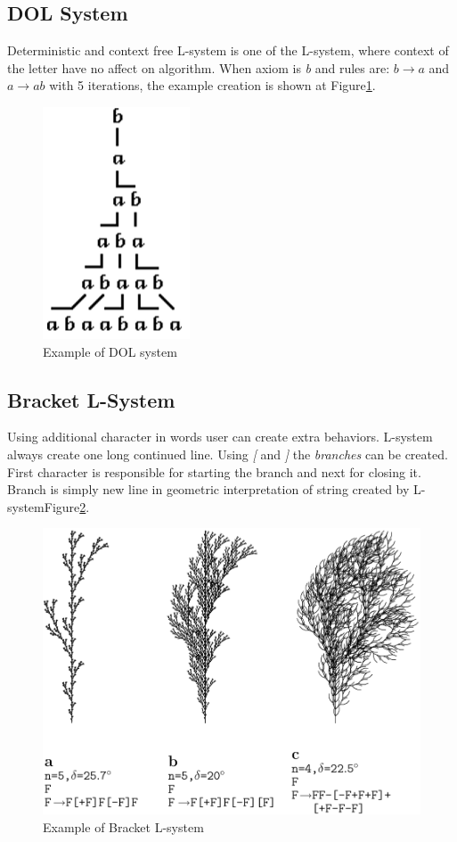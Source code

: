 \documentclass[b5paper,twoside,11pt]{article}
\renewcommand{\figurename}{Figure}
\begin{document}
\subsection{DOL System}
Deterministic and context free L-system is one of the L-system, where context of the letter have no affect on algorithm. When axiom is \textit{b} and rules are: $b \rightarrow a$ and $a \rightarrow ab$ with 5 iterations, the example creation is shown at \figurename\ref{DOL}.

\begin{figure}[!htp]
\centering
  \includegraphics[width=0.15\linewidth]{DOL-system}
\caption{Example of DOL system\cite{prusinABOP} \label{DOL}}
\end{figure}
\FloatBarrier
\subsection{Bracket L-System}
Using additional character in words user can create extra behaviors. L-system always create one long continued line. Using \textit{[} and \textit{]} the \textit{branches} can be created. First character is responsible for starting the branch and next for closing it. Branch is simply new line in geometric interpretation of string created by L-system\figurename\ref{branchingL}.
\begin{figure}[!htp]
\centering
  \includegraphics[width=0.7\linewidth]{branchingL}
\caption{Example of Bracket L-system\cite{prusinABOP} \label{branchingL}}
\end{figure}
\end{document}

